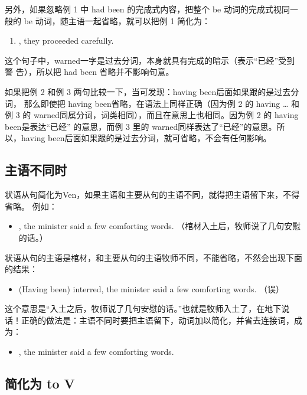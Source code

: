 另外，如果忽略例 1 中 had been 的完成式内容，把整个 be
动词的完成式视同一般的 be 动词，随主语一起省略，就可以把例 1 简化为：
\begin{enumerate}[resume]
\item {}, they proceeded carefully.
\end{enumerate}
这个句子中，warned一字是过去分词，本身就具有完成的暗示（表示“已经”受到警
告），所以把 had been 省略并不影响句意。

如果把例 2 和例 3 两句比较一下，当可发现：having been后面如果跟的是过去分词，
那么即使把 having been省略，在语法上同样正确（因为例 2 的 having \ldots{} 和
例 3 的 warned同属分词，词类相同），而且在意思上也相同。因为例 2 的 having
been是表达“已经” 的意思，而例 3 里的 warned同样表达了“已经”的意思。所
以，having been后面如果跟的是过去分词，就可省略，不会有任何影响。

\subsection{主语不同时}

状语从句简化为Ven，如果主语和主要从句的主语不同，就得把主语留下来，不得省略。
例如：

\begin{itemize}
\item {}, the minister said a few comforting
  words. （棺材入土后，牧师说了几句安慰的话。）
\end{itemize}
状语从句的主语是棺材，和主要从句的主语牧师不同，不能省略，不然会出现下面的结果：
\begin{itemize}
\item (Having been) interred, the minister said a few comforting words. （误）
\end{itemize}
这个意思是“入土之后，牧师说了几句安慰的话。”也就是牧师入土了，在地下说话！正确的做法是：主语不同时要把主语留下，动词加以简化，并省去连接词，成为：
\begin{itemize}
\item {}, the minister said a few comforting
  words.
\end{itemize}

\subsection{简化为 to V}

